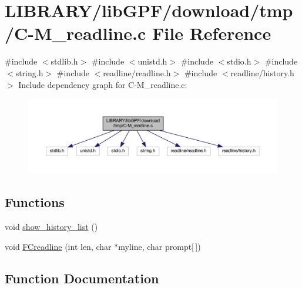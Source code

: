 \hypertarget{C-M__readline_8c}{}\section{L\+I\+B\+R\+A\+R\+Y/lib\+G\+P\+F/download/tmp/\+C-\/\+M\+\_\+readline.c File Reference}
\label{C-M__readline_8c}
{\ttfamily \#include $<$stdlib.\+h$>$}\newline
{\ttfamily \#include $<$unistd.\+h$>$}\newline
{\ttfamily \#include $<$stdio.\+h$>$}\newline
{\ttfamily \#include $<$string.\+h$>$}\newline
{\ttfamily \#include $<$readline/readline.\+h$>$}\newline
{\ttfamily \#include $<$readline/history.\+h$>$}\newline
Include dependency graph for C-\/\+M\+\_\+readline.c\+:
\nopagebreak
\begin{figure}[H]
\begin{center}
\leavevmode
\includegraphics[width=350pt]{C-M__readline_8c__incl}
\end{center}
\end{figure}
\subsection*{Functions}
\begin{DoxyCompactItemize}
\item 
void \hyperlink{C-M__readline_8c_a80269900528c2ee04bf7cacb3a07ff40}{show\+\_\+history\+\_\+list} ()
\item 
void \hyperlink{C-M__readline_8c_a146edc06a54e833494378446131c6bcd}{F\+Creadline} (int len, char $\ast$myline, char prompt\mbox{[}$\,$\mbox{]})
\end{DoxyCompactItemize}


\subsection{Function Documentation}
\mbox{\label{C-M__readline_8c_a146edc06a54e833494378446131c6bcd}} 
